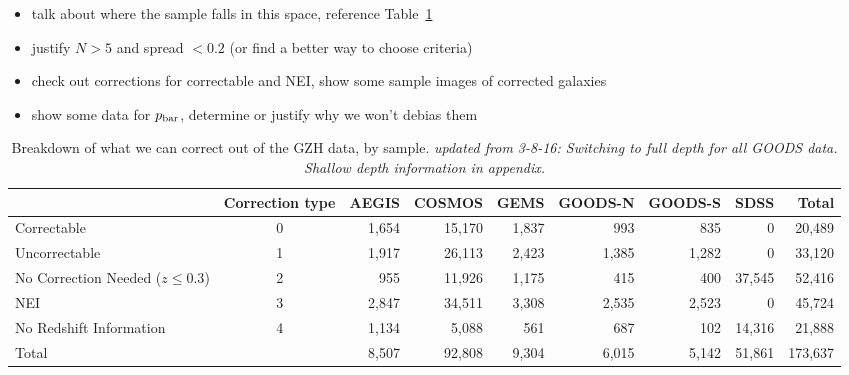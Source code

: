 \documentclass[usenatbib]{mn2e}
\begin{document}
\begin{itemize}
\item talk about where the \hst{} sample falls in this space, reference Table~\ref{tbl:hubble_debiasable} 
\item justify $N>5$ and spread $< 0.2$ (or find a better way to choose criteria)
\item check out corrections for correctable and NEI, show some sample images of corrected galaxies
\item show some data for $p_{\rm bar}$, determine or justify why we won't debias them  
\end{itemize}

 
\begin{table}
\caption{Breakdown of what we can correct out of the GZH data, by sample.  \emph{updated from 3-8-16: Switching to full depth for all GOODS data. Shallow depth information in appendix.}\label{tbl:hubble_debiasable}}
\begin{tabular}{lcrrrrrrr}
\hline\hline
                                   & Correction type & AEGIS   & COSMOS & GEMS & GOODS-N & GOODS-S    & SDSS    & Total \\
\hline
Correctable                        & 0               & 1,654   & 15,170 & 1,837 & 993    & 835     	& 0       & 20,489\\
Uncorrectable                      & 1               & 1,917   & 26,113 & 2,423 & 1,385  & 1,282   	& 0       & 33,120\\
No Correction Needed ($z \le 0.3$) & 2               & 955     & 11,926 & 1,175 & 415    & 400     	& 37,545  & 52,416\\ 
NEI                                & 3               & 2,847   & 34,511 & 3,308 & 2,535  & 2,523   	& 0       & 45,724\\
No Redshift Information            & 4               & 1,134   & 5,088  & 561   & 687    & 102   		& 14,316  & 21,888\\
Total                              &                 & 8,507   & 92,808 & 9,304 & 6,015  & 5,142   	& 51,861  & 173,637\\
\hline\hline
\end{tabular}
\end{table}
\end{document}
